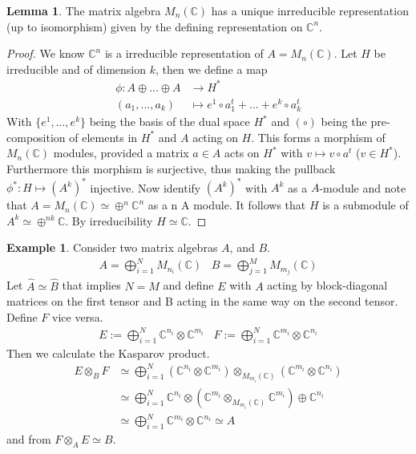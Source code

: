 \documentclass[a4paper]{article}
\theoremstyle{definition}
\theoremstyle{definition}
\theoremstyle{definition}
\newtheorem{example}{Example}
\theoremstyle{theorem}
\theoremstyle{theorem}
\theoremstyle{theorem}
\newtheorem{lemma}{Lemma}
\theoremstyle{definition}
\begin{document}
\begin{lemma}
    The matrix algebra $M_n(\mathbb{C})$ has a unique inrreducible representation (up to isomorphism)
    given by the defining representation on $\mathbb{C}^n$.
\end{lemma}
\begin{proof}
    We know $\mathbb{C}^n$ is a irreducible representation of $A= M_n(\mathbb{C})$. Let $H$ be irreducible
    and of dimension $k$, then we define a map
    \begin{align*}
        \phi : A\oplus...\oplus A &\rightarrow H^* \\
        (a_1,...,a_k)             &\mapsto e^1\circ a_1^t+...+e^k\circ a_k^t
    \end{align*}
    With $\{e^1,...,e^k\}$ being the basis of the dual space $H^*$ and $(\circ)$ being the pre-composition
    of elements in $H^*$ and $A$ acting on $H$. This forms a morphism of $M_n(\mathbb{C})$ modules,
    provided a matrix $a \in A$ acts on $H^*$ with $v\mapsto v\circ a^t$ ($v\in H^*$).
    Furthermore this morphism is surjective, thus making the pullback $\phi ^*:H\mapsto (A^k)^*$ injective.
    Now identify $(A^k)^*$ with $A^k$ as a $A$-module and note that
    $A=M_n(\mathbb{C}) \simeq \oplus ^n \mathbb{C}^n$ as a n A module.
    It follows that $H$ is a submodule of $A^k \simeq \oplus ^{nk}\mathbb{C}$. By irreducibility
    $H \simeq \mathbb{C}$.
\end{proof}

\begin{example}
    Consider two matrix algebras $A$, and $B$.
    \begin{align*}
        A = \bigoplus ^N_{i=1} M_{n_i}(\mathbb{C}) \;\;\; B = \bigoplus ^M_{j=1} M_{m_j}(\mathbb{C})
    \end{align*}
    Let $\hat{A} \simeq \hat{B}$ that implies $N=M$ and define $E$ with $A$ acting by block-diagonal
    matrices on the first tensor and B acting in the same way on the second tensor. Define $F$ vice versa.
    \begin{align*}
        E:= \bigoplus _{i=1}^N \mathbb{C}^{n_i} \otimes \mathbb{C}^{m_i} \;\;\;
        F:= \bigoplus _{i=1}^N \mathbb{C}^{m_i} \otimes \mathbb{C}^{n_i}
    \end{align*}
    Then we calculate the Kasparov product.
    \begin{align*}
        E \otimes _B F &\simeq \bigoplus _{i=1}^N (\mathbb{C}^{n_i}\otimes\mathbb{C}^{m_i})
            \otimes _{M_{m_i}(\mathbb{C})} (\mathbb{C}^{m_i}\otimes\mathbb{C}^{n_i}) \\
                       &\simeq \bigoplus _{i=1}^N \mathbb{C}^{n_i}\otimes
                       \left(\mathbb{C}^{m_i}\otimes _{M_{m_i}(\mathbb{C})}\mathbb{C}^{m_i}\right)
                        \oplus \mathbb{C}^{n_i} \\
                       &\simeq \bigoplus _{i=1}^N \mathbb{C}^{m_i}\otimes\mathbb{C}^{n_i} \simeq A
    \end{align*}
    and from $F \otimes _A E \simeq B$.
\end{example}
\end{document}

